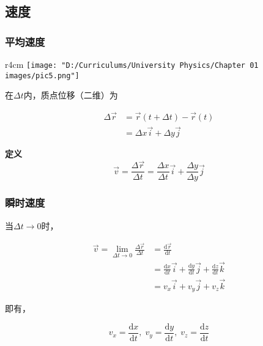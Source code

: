 \documentclass[12pt, a4paper]{article}
\newcommand{\rmd}{\mathrm{d}}
\begin{document}
\subsection{速度}

\subsubsection{平均速度}

    \begin{wrapfigure}{r}{4cm}
        \centering
        \texttt{[image: "D:/Curriculums/University Physics/Chapter 01 images/pic5.png"]}
        \label{pic5}
    \end{wrapfigure}

    在\(\Delta t\)内，质点位移（二维）为

    \begin{align*}
        \Delta \overrightarrow{r} &= \overrightarrow{r} \left(t + \Delta t\right) -
        \overrightarrow{r} \left(t\right)
        \\
        &= \Delta x \overrightarrow{i} + \Delta y \overrightarrow{j}
    \end{align*}

    \textbf{定义}
    \[
    \overrightarrow{v} = \frac{\Delta \overrightarrow{r}}{\Delta t} =
    \frac{\Delta x}{\Delta t} \overrightarrow{i} + \frac{\Delta y}{\Delta y} \overrightarrow{j}
    \]

\subsubsection{瞬时速度}

    当\(\Delta t \rightarrow 0\)时，

    \begin{align*}
        \overrightarrow{v} = \lim_{\Delta t \rightarrow 0}\frac{\Delta \overrightarrow{r}}{\Delta t}
        &= \frac{\rmd \overrightarrow{r}}{\rmd t}
        \\
        &= \frac{\rmd x}{\rmd t} \overrightarrow{i} + \frac{\rmd y}{\rmd t} \overrightarrow{j}
        + \frac{\rmd z}{\rmd t} \overrightarrow{k}
        \\
        & = v_{x} \overrightarrow{i} + v_{y} \overrightarrow{j} + v_{z} \overrightarrow{k}
    \end{align*}

    即有，

    \[
    v_{x} = \frac{\rmd x}{\rmd t},\; v_{y} = \frac{\rmd y}{\rmd t},\; v_{z} = \frac{\rmd z}{\rmd t}
    \]
\end{document}
